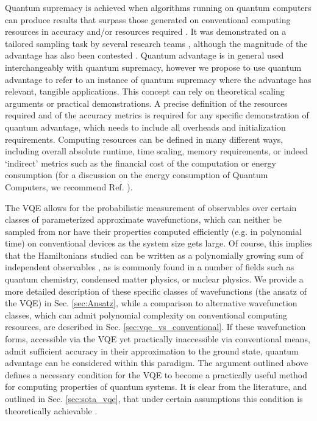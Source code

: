 Quantum supremacy is achieved when algorithms running on quantum computers can produce results that surpass those generated on conventional computing resources in accuracy and/or resources required \cite{Preskill2013}. It was demonstrated on a tailored sampling task by several research teams \cite{Arute2019, Zhong2020, Wu2021, Madsen2022}, although the magnitude of the advantage has also been contested \cite{Pednault2021, Liu2021}. Quantum advantage is in general used interchangeably with quantum supremacy, however we propose to use quantum advantage to refer to an instance of quantum supremacy where the advantage has relevant, tangible applications. This concept can rely on theoretical scaling arguments or practical demonstrations. A precise definition of the resources required and of the accuracy metrics is required for any specific demonstration of quantum advantage, which needs to include all overheads and initialization requirements. Computing resources can be defined in many different ways, including overall absolute runtime, time scaling, memory requirements, or indeed `indirect' metrics such as the financial cost of the computation or energy consumption (for a discussion on the energy consumption of Quantum Computers, we recommend Ref. \cite{Jaschke2022}).

The VQE allows for the probabilistic measurement of observables over certain classes of parameterized approximate wavefunctions, which can neither be sampled from nor have their properties computed efficiently (e.g. in polynomial time) on conventional devices as the system size gets large. Of course, this implies that the Hamiltonians studied can be written as a polynomially growing sum of independent observables \cite{Peruzzo2014}, as is commonly found in a number of fields such as quantum chemistry, condensed matter physics, or nuclear physics. We provide a more detailed description of these specific classes of wavefunctions (the ansatz of the VQE) in Sec. \ref{sec:Ansatz}, while a comparison to alternative wavefunction classes, which can admit polynomial complexity on conventional computing resources, are described in Sec. \ref{sec:vqe_vs_conventional}. If these wavefunction forms, accessible via the VQE yet practically inaccessible via conventional means, admit sufficient accuracy in their approximation to the ground state, quantum advantage can be considered within this paradigm. The argument outlined above defines a necessary condition for the VQE to become a practically useful method for computing properties of quantum systems. It is clear from the literature, and outlined in Sec. \ref{sec:sota_vqe}, that under certain assumptions this condition is theoretically achievable \cite{Peruzzo2014, Barkoutsos2018, OMalley2016, Wecker2015, Lee2019, Wiersema2020}.

